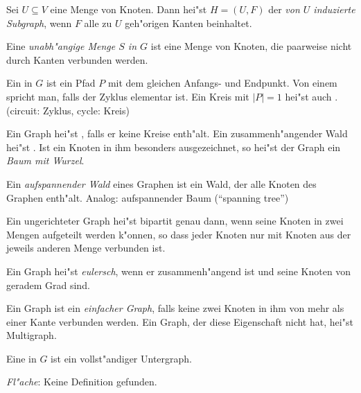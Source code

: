 {  Sei $U\subseteq V$ eine Menge von Knoten. Dann hei"st $H=(U,F)$ der
  {\itshape von $U$ induzierte Subgraph}, wenn $F$ alle zu $U$ geh"origen 
  Kanten beinhaltet.
  
  Eine {\itshape unabh"angige Menge $S$ in $G$} ist eine Menge von Knoten,
  die paarweise nicht durch Kanten verbunden werden.
  
  Ein {\itshape {}} in $G$ ist ein Pfad $P$ mit 
  dem gleichen Anfangs- und Endpunkt. Von einem {\itshape {}} 
  spricht man, falls der Zyklus elementar ist. Ein Kreis mit $|P|=1$ hei"st auch
  {\itshape {}}.
  (circuit: Zyklus, cycle: Kreis)
  
  Ein Graph hei"st \textit{}, falls er keine Kreise enth"alt. 
  Ein zusammenh"angender Wald hei"st \textit{}.
  Ist ein Knoten in ihm besonders ausgezeichnet, so hei"st der Graph ein 
  \textit{Baum mit Wurzel}.
  
  Ein \textit{aufspannender Wald} eines Graphen ist ein Wald, der alle
  Knoten des Graphen enth"alt. Analog: aufspannender Baum (``spanning tree'')
  
  Ein ungerichteter Graph hei"st bipartit genau dann, wenn seine Knoten 
  in zwei Mengen aufgeteilt werden k"onnen, so dass jeder Knoten nur mit 
  Knoten aus der jeweils anderen Menge verbunden ist.
  
  Ein Graph hei"st \textit{eulersch}, wenn er zusammenh"angend ist und seine 
  Knoten von geradem Grad sind.
  
  Ein Graph ist ein \textit{einfacher Graph}, falls keine zwei Knoten
  in ihm von mehr als einer Kante verbunden werden. Ein Graph, der
  diese Eigenschaft nicht hat, hei"st Multigraph.
  
  Eine {\itshape {}} in $G$ ist ein vollst"andiger Untergraph.
  
  {\itshape Fl"ache}: Keine Definition gefunden.
}
